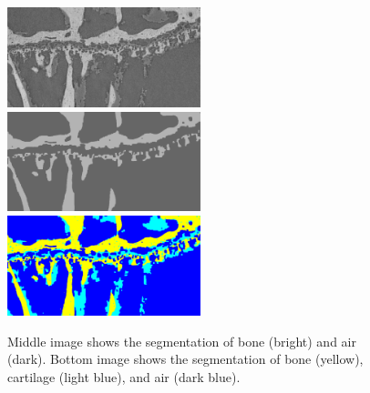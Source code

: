 \documentclass[a4paper]{article}
\begin{document}
	\begin{figure}[htbp]
	\centering
	\includegraphics[width=0.5\textwidth]{./figures/assign2_raw.png}
	\includegraphics[width=0.5\textwidth]{./figures/assign2_seg.png}
	\includegraphics[width=0.5\textwidth]{./figures/assign2_mseg.png}
	\caption{Middle image shows the segmentation of bone (bright) and air (dark). Bottom image shows the segmentation of bone (yellow), cartilage (light blue), and air (dark blue).}
\end{figure}
\end{document}
